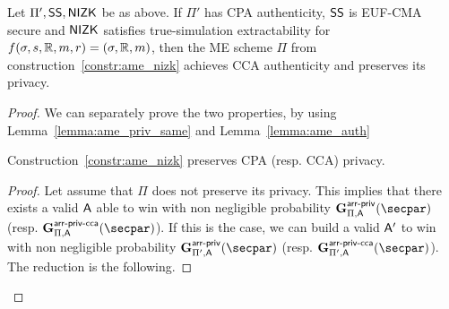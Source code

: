 \begin{theorem}\label{theo:ame_nizk_auth}
    Let $\Pi', \mathsf{SS}, \mathsf{NIZK}$ be as above.
    If $\Pi'$ has CPA authenticity, $\mathsf{SS}$ is EUF-CMA secure and $\mathsf{NIZK}$ satisfies true-simulation extractability for $f(\sigma, s, \mathbb{R}, m, r) = (\sigma, \mathbb{R}, m)$, then the ME scheme $\Pi$ from construction~\ref{constr:ame_nizk} achieves CCA authenticity and preserves its privacy.
\end{theorem}

\begin{proof}
    We can separately prove the two properties, by using Lemma~\ref{lemma:ame_priv_same} and Lemma~\ref{lemma:ame_auth}

    \begin{lemma}\label{lemma:ame_priv_same}
        Construction~\ref{constr:ame_nizk} preserves CPA (resp. CCA) privacy.
        \begin{proof}
            Let assume that $\Pi$ does not preserve its privacy. This implies that there exists a valid $\mathsf{A}$ able to win with non negligible probability $\NISHmatchgame{\arranged}_{\Pi, \adversary}(\secpar)$ (resp. $\NISHmatchgamecca{\arranged}_{\Pi, \adversary}(\secpar)$). If this is the case, we can build a valid $\mathsf{A}'$ to win with non negligible probability $\NISHmatchgame{\arranged}_{\Pi', \adversary}(\secpar)$ (resp. $\NISHmatchgamecca{\arranged}_{\Pi', \adversary}(\secpar)$). The reduction is the following.


\end{proof}
\end{lemma}
\end{proof}
